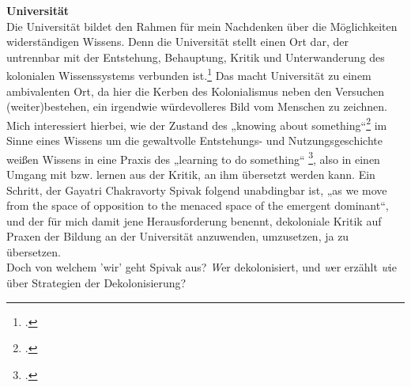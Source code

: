 \textbf{\large Universität}\\
Die Universität bildet den Rahmen für mein Nachdenken über die Möglichkeiten
widerständigen Wissens. Denn die Universität stellt einen Ort dar, der
untrennbar mit der Entstehung, Behauptung, Kritik und Unterwanderung des
kolonialen Wissenssystems verbunden ist.\footnotemark\footcitetext{grosfugel}
Das macht Universität zu einem ambivalenten Ort, da hier die Kerben des
Kolonialismus neben den Versuchen (weiter)bestehen, ein irgendwie würdevolleres
Bild vom Menschen zu zeichnen.\\
Mich interessiert hierbei, wie der Zustand des „knowing about
something“\footnotemark \footcitetext{spivak} im
Sinne eines Wissens um die gewaltvolle Entstehungs- und Nutzungsgeschichte
weißen Wissens in eine Praxis des „learning to do something“\footnotemark
\footcitetext{spivak}, also in einen Umgang mit bzw. lernen aus der Kritik, an
ihm übersetzt werden kann. Ein Schritt, der Gayatri Chakravorty Spivak folgend
unabdingbar ist, „as we move from the space of opposition to the menaced space
of the emergent dominant“\footnotemark{}, und der für mich damit jene Herausforderung
benennt, dekoloniale Kritik auf Praxen der Bildung an der Universität
anzuwenden, umzusetzen, ja zu übersetzen.\\
Doch von welchem 'wir' geht Spivak
aus? \textit{W}er dekolonisiert, und \textit{w}er erzählt \textit{w}ie über Strategien der
Dekolonisierung?\\

